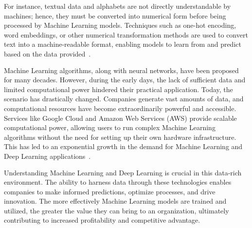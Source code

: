 \documentclass[12pt,a4paper]{report}
\begin{document}
For instance, textual data and alphabets are not directly understandable by machines; hence, they must be converted into numerical form before being processed by Machine Learning models. Techniques such as one-hot encoding, word embeddings, or other numerical transformation methods are used to convert text into a machine-readable format, enabling models to learn from and predict based on the data provided~\cite{machinelearning}.

Machine Learning algorithms, along with neural networks, have been proposed for many decades. However, during the early days, the lack of sufficient data and limited computational power hindered their practical application. Today, the scenario has drastically changed. Companies generate vast amounts of data, and computational resources have become extraordinarily powerful and accessible. Services like Google Cloud and Amazon Web Services (AWS) provide scalable computational power, allowing users to run complex Machine Learning algorithms without the need for setting up their own hardware infrastructure. This has led to an exponential growth in the demand for Machine Learning and Deep Learning applications~\cite{machinelearning}.

Understanding Machine Learning and Deep Learning is crucial in this data-rich environment. The ability to harness data through these technologies enables companies to make informed predictions, optimize processes, and drive innovation. The more effectively Machine Learning models are trained and utilized, the greater the value they can bring to an organization, ultimately contributing to increased profitability and competitive advantage.
\end{document}
